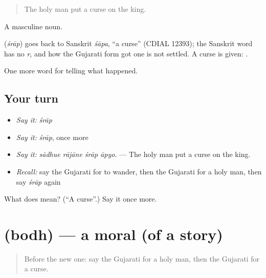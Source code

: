 \begin{quote}
The holy man put a curse on the king.
\end{quote}

A masculine noun.

\begin{cousinweb}
\textbf{} (\emph{śrāp}) goes back to Sanskrit \emph{śāpa}, \textquotedblleft{}a curse\textquotedblright{} (CDIAL 12393); the Sanskrit word has no \emph{r}, and how the Gujarati form got one is not settled. A curse is given: \textbf{ }.
\end{cousinweb}

\begin{grammarlens}[title={What you've built}]
One more word for telling what happened.
\end{grammarlens}

\subsection*{Your turn}
\begin{itemize}
\raggedright
  \item \emph{Say it:} \emph{śrāp}
  \item \emph{Say it:} \emph{śrāp}, once more
  \item \emph{Say it:} \emph{sādhue rājāne śrāp āpyo.} — The holy man put a curse on the king.
  \item \emph{Recall:} say the Gujarati for to wander, then the Gujarati for a holy man, then say \emph{śrāp} again
\end{itemize}

\begin{tcolorbox}[breakable,colback=teal!4,colframe=teal!35!black,title={Before you move on}]
What does  mean? (\textquotedblleft{}A curse\textquotedblright{}.) Say it once more.
\end{tcolorbox}
\section[\texorpdfstring{\gu{બોધ} (bodh)}{બોધ (bodh)}]{ (bodh) — a moral (of a story)}

\label{lesson:GU-C335-bodh}



\begin{quote}
Before the new one: say the Gujarati for a holy man, then the Gujarati for a curse.
\end{quote}

